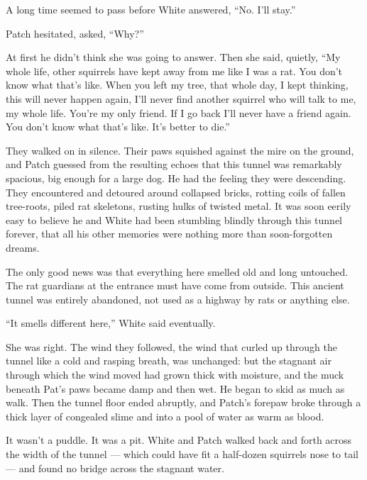 \documentclass[ebook,oneside,openany,17pt]{memoir}
\newenvironment{tolerant}[1]{%
  \par\tolerance=#1\relax
}{%
  \par
}
\begin{document}
A long time seemed to pass before White answered, “No. I’ll stay.”

Patch hesitated, asked, “Why?”

At first he didn’t think she was going to answer. Then she said,
quietly, “My whole life, other squirrels have kept away from me like I
was a rat. You don’t know what that’s like. When you left my tree,
that whole day, I kept thinking, this will never happen again, I’ll
never find another squirrel who will talk to me, my whole life. You’re
my only friend. If I go back I’ll never have a friend again. You don’t
know what that’s like. It’s better to die.”

\begin{tolerant}{2000}
They walked on in silence. Their paws squished against the mire on the
ground, and Patch guessed from the resulting echoes that this tunnel
was remarkably spacious, big enough for a large dog. He had the
feeling they were descending. They encountered and detoured around
collapsed bricks, rotting coils of fallen tree-roots, piled rat
skeletons, rusting hulks of twisted metal. It was soon eerily easy to
believe he and White had been stumbling blindly through this tunnel
forever, that all his other memories were nothing more than
soon-forgotten dreams.
\end{tolerant}

The only good news was that everything here smelled old and long
untouched. The rat guardians at the entrance must have come from
outside. This ancient tunnel was entirely abandoned, not used as a
highway by rats or anything else.

“It smells different here,” White said eventually.

She was right. The wind they followed, the wind that curled up through
the tunnel like a cold and rasping breath, was unchanged: but the
stagnant air through which the wind moved had grown thick with
moisture, and the muck beneath Pat’s paws became damp and then wet. He
began to skid as much as walk. Then the tunnel floor ended abruptly,
and Patch’s forepaw broke through a thick layer of congealed slime and
into a pool of water as warm as blood.

\begin{tolerant}{1000}
It wasn’t a puddle. It was a pit. White and Patch walked back and
forth across the width of the tunnel — which could have fit a
half-dozen squirrels nose to tail — and found no bridge across the
stagnant water.
\end{tolerant}
\end{document}
